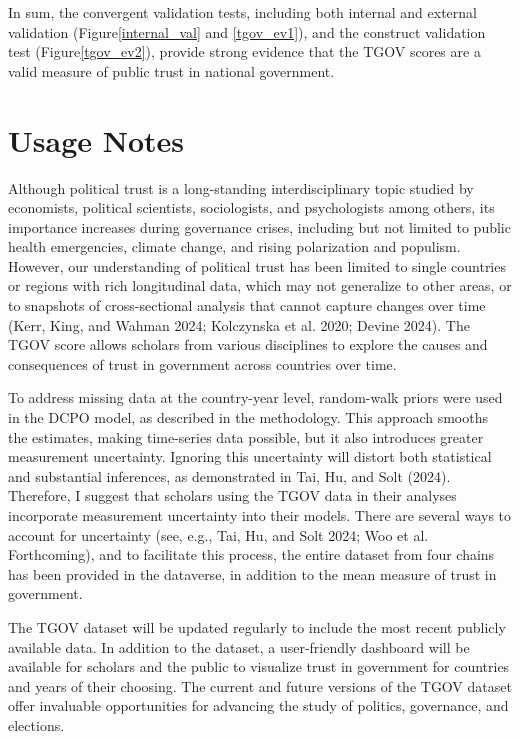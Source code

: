 \documentclass[
  12pt,
]{article}
\begin{document}
In sum, the convergent validation tests, including both internal and external validation (Figure\nobreakspace{}\ref{internal_val} and \nobreakspace{}\ref{tgov_ev1}), and the construct validation test (Figure\nobreakspace{}\ref{tgov_ev2}), provide strong evidence that the TGOV scores are a valid measure of public trust in national government.

\section{Usage Notes}\label{usage-notes}

Although political trust is a long-standing interdisciplinary topic studied by economists, political scientists, sociologists, and psychologists among others, its importance increases during governance crises, including but not limited to public health emergencies, climate change, and rising polarization and populism.
However, our understanding of political trust has been limited to single countries or regions with rich longitudinal data, which may not generalize to other areas, or to snapshots of cross-sectional analysis that cannot capture changes over time (Kerr, King, and Wahman 2024; Kolczynska et al. 2020; Devine 2024).
The TGOV score allows scholars from various disciplines to explore the causes and consequences of trust in government across countries over time.

To address missing data at the country-year level, random-walk priors were used in the DCPO model, as described in the methodology.
This approach smooths the estimates, making time-series data possible, but it also introduces greater measurement uncertainty.
Ignoring this uncertainty will distort both statistical and substantial inferences, as demonstrated in Tai, Hu, and Solt (2024).
Therefore, I suggest that scholars using the TGOV data in their analyses incorporate measurement uncertainty into their models.
There are several ways to account for uncertainty (see, e.g., Tai, Hu, and Solt 2024; Woo et al. Forthcoming), and to facilitate this process, the entire dataset from four chains has been provided in the dataverse, in addition to the mean measure of trust in government.

The TGOV dataset will be updated regularly to include the most recent publicly available data.
In addition to the dataset, a user-friendly dashboard will be available for scholars and the public to visualize trust in government for countries and years of their choosing.
The current and future versions of the TGOV dataset offer invaluable opportunities for advancing the study of politics, governance, and elections.
\end{document}
